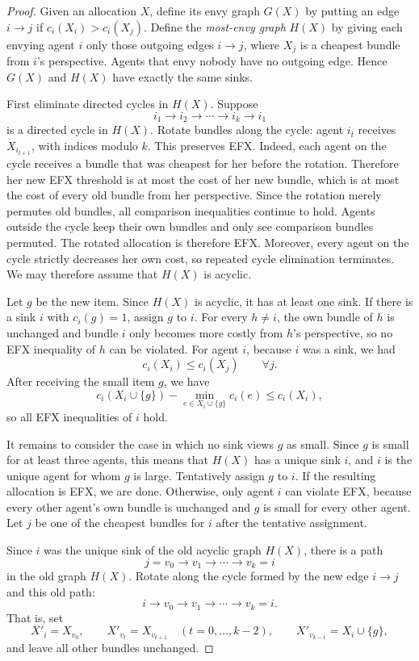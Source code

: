 \documentclass{article}
\theoremstyle{definition}
\begin{document}
\begin{proof}
Given an allocation $X$, define its envy graph $G(X)$ by putting an edge
$i\to j$ if $c_i(X_i)>c_i(X_j)$.  Define the \emph{most-envy graph} $H(X)$
by giving each envying agent $i$ only those outgoing edges $i\to j$, where
$X_j$ is a cheapest bundle from $i$'s perspective.  Agents that envy nobody
have no outgoing edge.  Hence $G(X)$ and $H(X)$ have exactly the same sinks.

First eliminate directed cycles in $H(X)$.  Suppose
\[
 i_1\to i_2\to\cdots\to i_k\to i_1
\]
is a directed cycle in $H(X)$.  Rotate bundles along the cycle: agent $i_t$
receives $X_{i_{t+1}}$, with indices modulo $k$.  This preserves EFX.  Indeed,
each agent on the cycle receives a bundle that was cheapest for her before
the rotation.  Therefore her new EFX threshold is at most the cost of her
new bundle, which is at most the cost of every old bundle from her
perspective.  Since the rotation merely permutes old bundles, all comparison
inequalities continue to hold.  Agents outside the cycle keep their own
bundles and only see comparison bundles permuted.  The rotated allocation is
therefore EFX.  Moreover, every agent on the cycle strictly decreases her
own cost, so repeated cycle elimination terminates.  We may therefore assume
that $H(X)$ is acyclic.

Let $g$ be the new item.  Since $H(X)$ is acyclic, it has at least one sink.
If there is a sink $i$ with $c_i(g)=1$, assign $g$ to $i$.  For every
$h\ne i$, the own bundle of $h$ is unchanged and bundle $i$ only becomes more costly from $h$'s perspective, so no EFX inequality of $h$ can
be violated.  For agent $i$, because $i$ was a sink, we had
\[
 c_i(X_i)\le c_i(X_j)\qquad\forall j.
\]
After receiving the small item $g$, we have
\[
 c_i(X_i\cup\{g\})-\min_{e\in X_i\cup\{g\}}c_i(e)
 \le c_i(X_i),
\]
so all EFX inequalities of $i$ hold.

It remains to consider the case in which no sink views $g$ as small.  Since
$g$ is small for at least three agents, this means that $H(X)$ has a unique
sink $i$, and $i$ is the unique agent for whom $g$ is large.
Tentatively assign $g$ to $i$.  If the resulting allocation is EFX, we are
done.  Otherwise, only agent $i$ can violate EFX, because every other agent's
own bundle is unchanged and $g$ is small for every other agent.  Let $j$ be
one of the cheapest bundles for $i$ after the tentative assignment.

Since $i$ was the unique sink of the old acyclic graph $H(X)$, there is a
path
\[
 j=v_0\to v_1\to\cdots\to v_k=i
\]
in the old graph $H(X)$.  Rotate along the cycle formed by the new edge
$i\to j$ and this old path:
\[
 i\to v_0\to v_1\to\cdots\to v_k=i.
\]
That is, set
\[
 X'_i=X_{v_0},\qquad
 X'_{v_t}=X_{v_{t+1}}\quad (t=0,\ldots,k-2),\qquad
 X'_{v_{k-1}}=X_i\cup\{g\},
\]
and leave all other bundles unchanged.


\end{proof}
\end{document}
